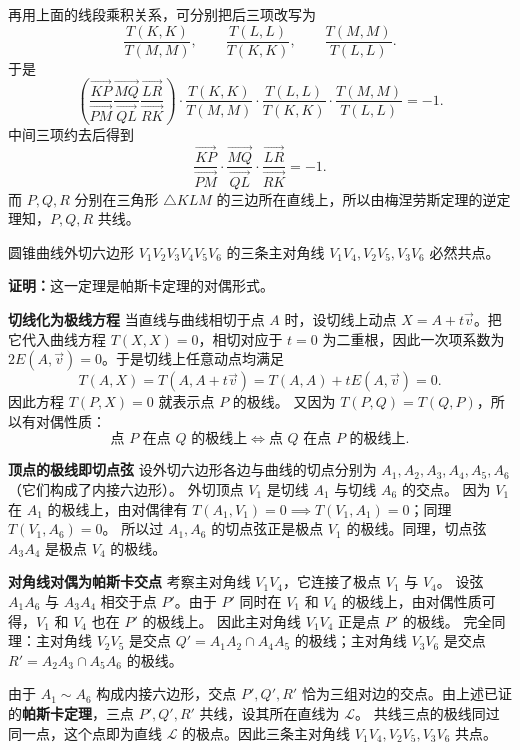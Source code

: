 再用上面的线段乘积关系，可分别把后三项改写为
\[
\frac{T(K,K)}{T(M,M)},\qquad \frac{T(L,L)}{T(K,K)},\qquad \frac{T(M,M)}{T(L,L)}.
\]
于是
\[
\left( \frac{\overrightarrow{KP}}{\overrightarrow{PM}} \frac{\overrightarrow{MQ}}{\overrightarrow{QL}} \frac{\overrightarrow{LR}}{\overrightarrow{RK}} \right)
\cdot \frac{T(K,K)}{T(M,M)} \cdot \frac{T(L,L)}{T(K,K)} \cdot \frac{T(M,M)}{T(L,L)} = -1.
\]
中间三项约去后得到
\[
\frac{\overrightarrow{KP}}{\overrightarrow{PM}} \cdot \frac{\overrightarrow{MQ}}{\overrightarrow{QL}} \cdot \frac{\overrightarrow{LR}}{\overrightarrow{RK}} = -1.
\]
而 $P,Q,R$ 分别在三角形 $\triangle KLM$ 的三边所在直线上，所以由梅涅劳斯定理的逆定理知，$P,Q,R$ 共线。

\begin{conclusion}
圆锥曲线外切六边形 $V_1V_2V_3V_4V_5V_6$ 的三条主对角线 $V_1V_4, V_2V_5, V_3V_6$ 必然共点。
\end{conclusion}
\textbf{证明：}这一定理是帕斯卡定理的对偶形式。

\textbf{切线化为极线方程}
当直线与曲线相切于点 $A$ 时，设切线上动点 $X=A+t\vec{v}$。把它代入曲线方程 $T(X,X)=0$，相切对应于 $t=0$ 为二重根，因此一次项系数为 $2E(A,\vec{v})=0$。于是切线上任意动点均满足
\[
T(A, X) = T(A, A+t\vec{v}) = T(A,A) + tE(A,\vec{v}) = 0.
\]
因此方程 $T(P, X) = 0$ 就表示点 $P$ 的极线。
又因为 $T(P, Q) = T(Q, P)$，所以有对偶性质：
\[
\text{点 } P \text{ 在点 } Q \text{ 的极线上}\iff \text{点 } Q \text{ 在点 } P \text{ 的极线上}.
\]

\textbf{顶点的极线即切点弦}
设外切六边形各边与曲线的切点分别为 $A_1, A_2, A_3, A_4, A_5, A_6$（它们构成了内接六边形）。
外切顶点 $V_1$ 是切线 $A_1$ 与切线 $A_6$ 的交点。
因为 $V_1$ 在 $A_1$ 的极线上，由对偶律有 $T(A_1, V_1)=0 \implies T(V_1, A_1)=0$；同理 $T(V_1, A_6)=0$。
所以过 $A_1, A_6$ 的切点弦正是极点 $V_1$ 的极线。同理，切点弦 $A_3A_4$ 是极点 $V_4$ 的极线。

\textbf{对角线对偶为帕斯卡交点}
考察主对角线 $V_1 V_4$，它连接了极点 $V_1$ 与 $V_4$。
设弦 $A_1A_6$ 与 $A_3A_4$ 相交于点 $P'$。由于 $P'$ 同时在 $V_1$ 和 $V_4$ 的极线上，由对偶性质可得，$V_1$ 和 $V_4$ 也在 $P'$ 的极线上。
因此主对角线 $V_1V_4$ 正是点 $P'$ 的极线。
完全同理：主对角线 $V_2V_5$ 是交点 $Q' = A_1A_2 \cap A_4A_5$ 的极线；主对角线 $V_3V_6$ 是交点 $R' = A_2A_3 \cap A_5A_6$ 的极线。

由于 $A_1 \sim A_6$ 构成内接六边形，交点 $P', Q', R'$ 恰为三组对边的交点。由上述已证的\textbf{帕斯卡定理}，三点 $P', Q', R'$ 共线，设其所在直线为 $\mathcal{L}$。
共线三点的极线同过同一点，这个点即为直线 $\mathcal{L}$ 的极点。因此三条主对角线 $V_1V_4, V_2V_5, V_3V_6$ 共点。

